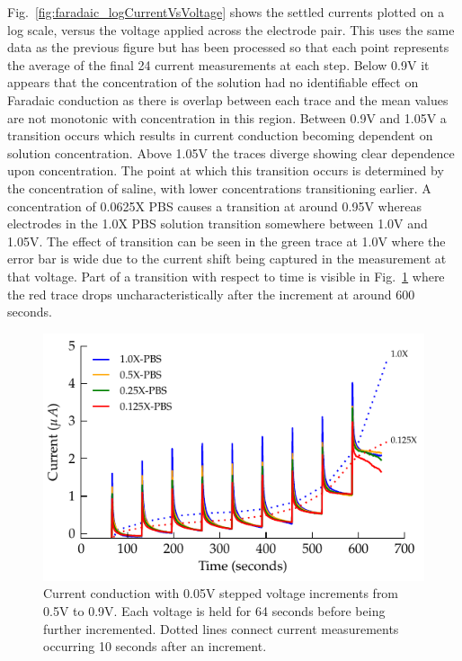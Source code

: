 \documentclass[journal, a4paper]{IEEEtran}
\begin{document}
Fig.~\ref{fig:faradaic_logCurrentVsVoltage} shows the settled currents plotted on a log scale, versus the voltage applied across the electrode {\color{blue} pair}. This uses the same data as the previous figure but has been processed so that each point represents the average of the final 24 current measurements at each step. Below 0.9\thinspace V it appears that the concentration of the solution had no identifiable effect on Faradaic conduction as there is overlap between each trace and the mean values are not monotonic with concentration in this region.  Between 0.9\thinspace V and 1.05\thinspace V a transition occurs which results in current conduction becoming dependent on solution concentration.
Above 1.05\thinspace V the traces diverge showing clear dependence upon concentration.
The point at which this transition occurs is determined by the concentration of saline, with lower concentrations transitioning earlier. A concentration of 0.0625X PBS causes a transition at around 0.95\thinspace V whereas electrodes in the 1.0X PBS solution transition somewhere between 1.0\thinspace V and 1.05\thinspace V. The effect of transition can be seen in the green trace at 1.0\thinspace V where the error bar is wide due to the current shift being captured in the measurement at that voltage. Part of a transition with respect to time is visible in Fig.~\ref{fig:StepResponse_Faradaic} where the red trace drops uncharacteristically after the increment at around 600 seconds.

\begin{figure}
    \begin{center}
        \includegraphics{graphics/currentTimeFaradaicCPE_Stacked_IEEE}
    \end{center}
    \caption{Current conduction with 0.05\thinspace V stepped voltage increments from 0.5\thinspace V to 0.9V. Each voltage is held for 64 seconds before being further incremented. Dotted lines connect current measurements occurring 10 seconds after an increment.}
    \label{fig:StepResponse_Faradaic}
\end{figure}
\end{document}
